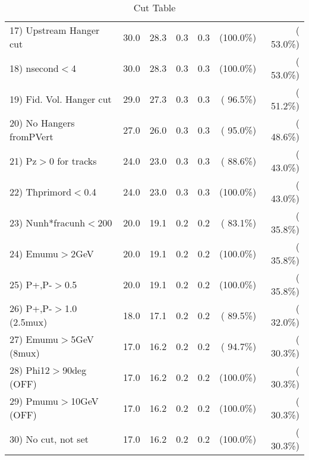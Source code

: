 \begin{table}[h!]
\begin{tabular}{||l||r|r|r|r|r|r||}
 17) Upstream Hanger cut  &         30.0 &         28.3 &          0.3 &          0.3 & (100.0\%) & ( 53.0\%) \\
 18) nsecond$<$4          &         30.0 &         28.3 &          0.3 &          0.3 & (100.0\%) & ( 53.0\%) \\
 19) Fid. Vol. Hanger cut &         29.0 &         27.3 &          0.3 &          0.3 & ( 96.5\%) & ( 51.2\%) \\
 20) No Hangers fromPVert &         27.0 &         26.0 &          0.3 &          0.3 & ( 95.0\%) & ( 48.6\%) \\
 21) Pz$>$0 for tracks    &         24.0 &         23.0 &          0.3 &          0.3 & ( 88.6\%) & ( 43.0\%) \\
 22) Thprimord$<$0.4      &         24.0 &         23.0 &          0.3 &          0.3 & (100.0\%) & ( 43.0\%) \\
 23) Nunh*fracunh$<$200   &         20.0 &         19.1 &          0.2 &          0.2 & ( 83.1\%) & ( 35.8\%) \\
 24) Emumu$>$2GeV         &         20.0 &         19.1 &          0.2 &          0.2 & (100.0\%) & ( 35.8\%) \\
 25) P+,P-$>$0.5          &         20.0 &         19.1 &          0.2 &          0.2 & (100.0\%) & ( 35.8\%) \\
 26) P+,P-$>$1.0 (2.5mux) &         18.0 &         17.1 &          0.2 &          0.2 & ( 89.5\%) & ( 32.0\%) \\
 27) Emumu$>$5GeV  (8mux) &         17.0 &         16.2 &          0.2 &          0.2 & ( 94.7\%) & ( 30.3\%) \\
 28) Phi12$>$90deg  (OFF) &         17.0 &         16.2 &          0.2 &          0.2 & (100.0\%) & ( 30.3\%) \\
 29) Pmumu$>$10GeV  (OFF) &         17.0 &         16.2 &          0.2 &          0.2 & (100.0\%) & ( 30.3\%) \\
 30) No cut, not set      &         17.0 &         16.2 &          0.2 &          0.2 & (100.0\%) & ( 30.3\%) \\
 \hline
 \hline
 \end{tabular}
 \caption{Cut Table           }
 \label{tab-cutcohjpsi-mumu_anuecc}
 \end{table}

